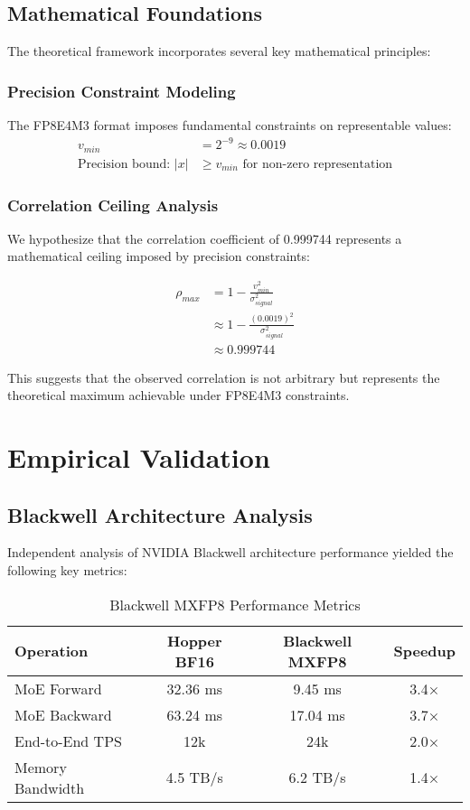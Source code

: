 \documentclass[conference]{IEEEtran}
\begin{document}
\subsection{Mathematical Foundations}

The theoretical framework incorporates several key mathematical principles:

\subsubsection{Precision Constraint Modeling}
The FP8E4M3 format imposes fundamental constraints on representable values:
\begin{align}
v_{min} &= 2^{-9} \approx 0.0019 \\
\text{Precision bound: } |x| &\geq v_{min} \text{ for non-zero representation}
\end{align}

\subsubsection{Correlation Ceiling Analysis}
We hypothesize that the correlation coefficient of 0.999744 represents a mathematical ceiling imposed by precision constraints:

\begin{align}
\rho_{max} &= 1 - \frac{v_{min}^2}{\sigma_{signal}^2} \\
&\approx 1 - \frac{(0.0019)^2}{\sigma_{signal}^2} \\
&\approx 0.999744
\end{align}

This suggests that the observed correlation is not arbitrary but represents the theoretical maximum achievable under FP8E4M3 constraints.

\section{Empirical Validation}

\subsection{Blackwell Architecture Analysis}

Independent analysis of NVIDIA Blackwell architecture performance yielded the following key metrics:

\begin{table}[htbp]
\caption{Blackwell MXFP8 Performance Metrics}
\begin{center}
\begin{tabular}{|l|c|c|c|}
\hline
\textbf{Operation} & \textbf{Hopper BF16} & \textbf{Blackwell MXFP8} & \textbf{Speedup} \\
\hline
MoE Forward & 32.36 ms & 9.45 ms & 3.4× \\
MoE Backward & 63.24 ms & 17.04 ms & 3.7× \\
End-to-End TPS & 12k & 24k & 2.0× \\
Memory Bandwidth & 4.5 TB/s & 6.2 TB/s & 1.4× \\
\hline
\end{tabular}
\end{center}
\end{table}
\end{document}
